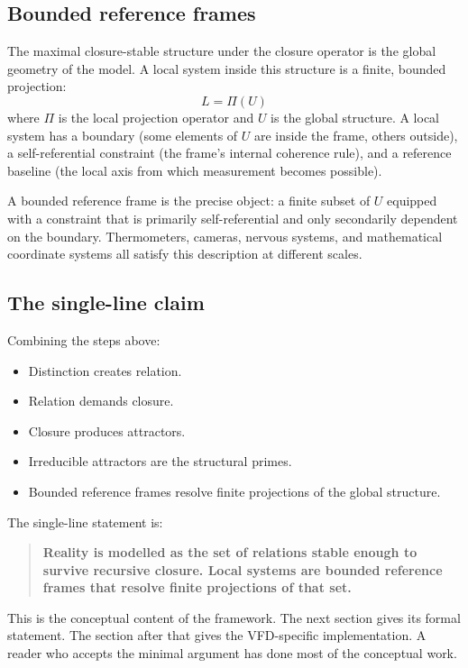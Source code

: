 \documentclass[11pt]{article}
\theoremstyle{plain}
\theoremstyle{definition}
\theoremstyle{remark}
\begin{document}
\subsection{Bounded reference frames}

The maximal closure-stable structure under the closure operator is the global geometry of the model. A local system inside this structure is a finite, bounded projection:
\[
  L = \Pi(U)
\]
where $\Pi$ is the local projection operator and $U$ is the global structure. A local system has a boundary (some elements of $U$ are inside the frame, others outside), a self-referential constraint (the frame's internal coherence rule), and a reference baseline (the local axis from which measurement becomes possible).

A bounded reference frame is the precise object: a finite subset of $U$ equipped with a constraint that is primarily self-referential and only secondarily dependent on the boundary. Thermometers, cameras, nervous systems, and mathematical coordinate systems all satisfy this description at different scales.

\subsection{The single-line claim}

Combining the steps above:

\begin{itemize}[leftmargin=2em]
\item Distinction creates relation.
\item Relation demands closure.
\item Closure produces attractors.
\item Irreducible attractors are the structural primes.
\item Bounded reference frames resolve finite projections of the global structure.
\end{itemize}

The single-line statement is:

\begin{quote}
\textbf{Reality is modelled as the set of relations stable enough to survive recursive closure. Local systems are bounded reference frames that resolve finite projections of that set.}
\end{quote}

This is the conceptual content of the framework. The next section gives its formal statement. The section after that gives the VFD-specific implementation. A reader who accepts the minimal argument has done most of the conceptual work.
\end{document}
